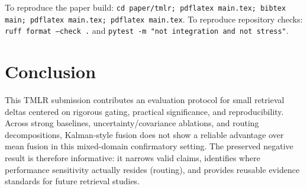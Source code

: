 \documentclass[10pt]{article}
\begin{document}
To reproduce the paper build: \texttt{cd paper/tmlr; pdflatex main.tex; bibtex main; pdflatex main.tex; pdflatex main.tex}. To reproduce repository checks: \texttt{ruff format --check .} and \texttt{pytest -m "not integration and not stress"}.

\section{Conclusion}
This TMLR submission contributes an evaluation protocol for small retrieval deltas centered on rigorous gating, practical significance, and reproducibility. Across strong baselines, uncertainty/covariance ablations, and routing decompositions, Kalman-style fusion does not show a reliable advantage over mean fusion in this mixed-domain confirmatory setting. The preserved negative result is therefore informative: it narrows valid claims, identifies where performance sensitivity actually resides (routing), and provides reusable evidence standards for future retrieval studies.


\end{document}

